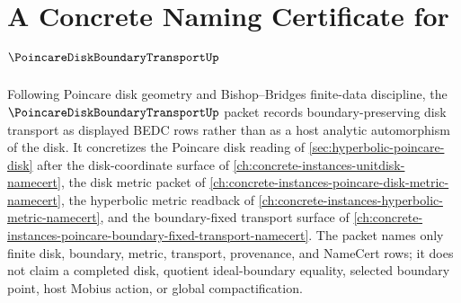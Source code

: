 \chapter{A Concrete Naming Certificate for $\PoincareDiskBoundaryTransportUp$}
\label{ch:concrete-instances-poincare-disk-boundary-transport-namecert}

Following Poincare disk geometry and Bishop--Bridges finite-data discipline, the $\PoincareDiskBoundaryTransportUp$ packet records boundary-preserving disk transport as displayed BEDC rows rather than as a host analytic automorphism of the disk. It concretizes the Poincare disk reading of \autoref{sec:hyperbolic-poincare-disk} after the disk-coordinate surface of \autoref{ch:concrete-instances-unitdisk-namecert}, the disk metric packet of \autoref{ch:concrete-instances-poincare-disk-metric-namecert}, the hyperbolic metric readback of \autoref{ch:concrete-instances-hyperbolic-metric-namecert}, and the boundary-fixed transport surface of \autoref{ch:concrete-instances-poincare-boundary-fixed-transport-namecert}. The packet names only finite disk, boundary, metric, transport, provenance, and NameCert rows; it does not claim a completed disk, quotient ideal-boundary equality, selected boundary point, host Mobius action, or global compactification.

